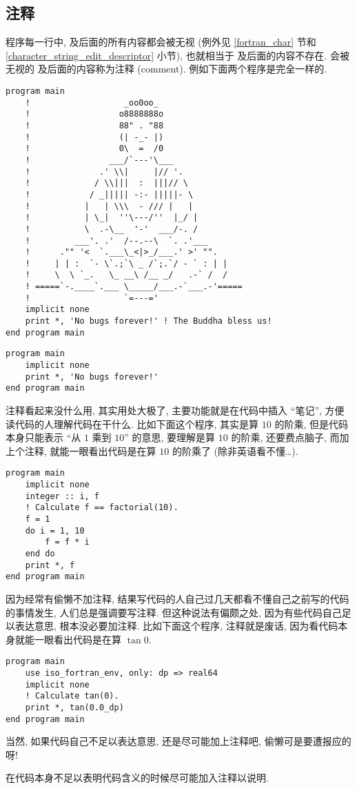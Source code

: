 \subsection{注释}

程序每一行中, \ttt{!} 及后面的所有内容都会被无视 (例外见 \ref{fortran_char} 节和 \ref{character_string_edit_descriptor} 小节), 也就相当于 \ttt{!} 及后面的内容不存在. 会被无视的 \ttt{!} 及后面的内容称为注释 (comment). 例如下面两个程序是完全一样的.
\begin{lstlisting}
program main
    !                   _oo0oo_
    !                  o8888888o
    !                  88" . "88
    !                  (| -_- |)
    !                  0\  =  /0
    !                ___/`---'\___
    !              .' \\|     |// '.
    !             / \\|||  :  |||// \
    !            / _||||| -:- |||||- \
    !           |   | \\\  - /// |   |
    !           | \_|  ''\---/''  |_/ |
    !           \  .-\__  '-'  ___/-. /
    !         ___'. .'  /--.--\  `. .'___
    !      ."" '<  `.___\_<|>_/___.' >' "".
    !     | | :  `- \`.;`\ _ /`;.`/ - ` : | |
    !     \  \ `_.   \_ __\ /__ _/   .-` /  /
    ! =====`-.____`.___ \_____/___.-`___.-'=====
    !                   `=---='
    implicit none
    print *, 'No bugs forever!' ! The Buddha bless us!
end program main
\end{lstlisting}
\begin{lstlisting}
program main
    implicit none
    print *, 'No bugs forever!'
end program main
\end{lstlisting}

注释看起来没什么用, 其实用处大极了, 主要功能就是在代码中插入 ``笔记'', 方便读代码的人理解代码在干什么. 比如下面这个程序, 其实是算 $10$ 的阶乘, 但是代码本身只能表示 ``从 $1$ 乘到 $10$'' 的意思, 要理解是算 $10$ 的阶乘, 还要费点脑子, 而加上个注释, 就能一眼看出代码是在算 $10$ 的阶乘了 (除非英语看不懂\dots{}).
\begin{lstlisting}
program main
    implicit none
    integer :: i, f
    ! Calculate f == factorial(10).
    f = 1
    do i = 1, 10
        f = f * i
    end do
    print *, f
end program main
\end{lstlisting}

因为经常有偷懒不加注释, 结果写代码的人自己过几天都看不懂自己之前写的代码的事情发生, 人们总是强调要写注释. 但这种说法有偏颇之处, 因为有些代码自己足以表达意思, 根本没必要加注释. 比如下面这个程序, 注释就是废话, 因为看代码本身就能一眼看出代码是在算 $\tan 0$.
\begin{lstlisting}
program main
    use iso_fortran_env, only: dp => real64
    implicit none
    ! Calculate tan(0).
    print *, tan(0.0_dp)
end program main
\end{lstlisting}
当然, 如果代码自己不足以表达意思, 还是尽可能加上注释吧, 偷懒可是要遭报应的呀!
\begin{convention}
    在代码本身不足以表明代码含义的时候尽可能加入注释以说明.
\end{convention}


